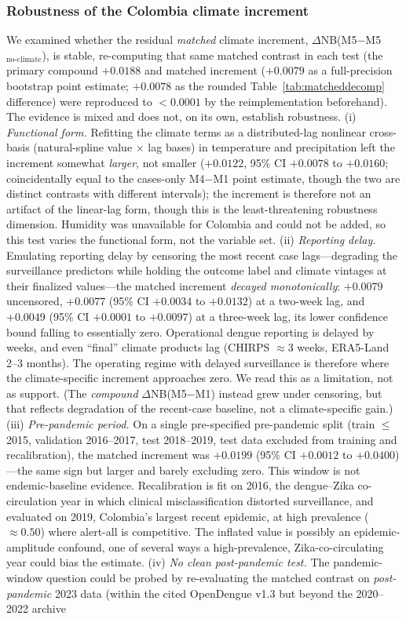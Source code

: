 \documentclass[11pt,a4paper]{article}
\begin{document}
\subsubsection*{Robustness of the Colombia climate increment}
We examined whether the residual \emph{matched} climate increment, $\Delta$NB(M5$-$M5$_{\text{no-climate}}$), is stable, re-computing that same matched contrast in each test (the primary compound $+0.0188$ and matched increment ($+0.0079$ as a full-precision bootstrap point estimate; $+0.0078$ as the rounded Table~\ref{tab:matcheddecomp} difference) were reproduced to $<0.0001$ by the reimplementation beforehand). The evidence is mixed and does not, on its own, establish robustness. (i) \emph{Functional form.} Refitting the climate terms as a distributed-lag nonlinear cross-basis (natural-spline value $\times$ lag bases) in temperature and precipitation left the increment somewhat \emph{larger}, not smaller ($+0.0122$, 95\% CI $+0.0078$ to $+0.0160$; coincidentally equal to the cases-only M4$-$M1 point estimate, though the two are distinct contrasts with different intervals); the increment is therefore not an artifact of the linear-lag form, though this is the least-threatening robustness dimension. Humidity was unavailable for Colombia and could not be added, so this test varies the functional form, not the variable set. (ii) \emph{Reporting delay.} Emulating reporting delay by censoring the most recent case lags---degrading the surveillance predictors while holding the outcome label and climate vintages at their finalized values---the matched increment \emph{decayed monotonically}: $+0.0079$ uncensored, $+0.0077$ (95\% CI $+0.0034$ to $+0.0132$) at a two-week lag, and $+0.0049$ (95\% CI $+0.0001$ to $+0.0097$) at a three-week lag, its lower confidence bound falling to essentially zero. Operational dengue reporting is delayed by weeks, and even ``final'' climate products lag (CHIRPS $\approx$3 weeks, ERA5-Land 2--3 months). The operating regime with delayed surveillance is therefore where the climate-specific increment approaches zero. We read this as a limitation, not as support. (The \emph{compound} $\Delta$NB(M5$-$M1) instead grew under censoring, but that reflects degradation of the recent-case baseline, not a climate-specific gain.) (iii) \emph{Pre-pandemic period.} On a single pre-specified pre-pandemic split (train $\le$2015, validation 2016--2017, test 2018--2019, test data excluded from training and recalibration), the matched increment was $+0.0199$ (95\% CI $+0.0012$ to $+0.0400$)---the same sign but larger and barely excluding zero. This window is not endemic-baseline evidence. Recalibration is fit on 2016, the dengue--Zika co-circulation year in which clinical misclassification distorted surveillance, and evaluated on 2019, Colombia's largest recent epidemic, at high prevalence ($\approx0.50$) where alert-all is competitive. The inflated value is possibly an epidemic-amplitude confound, one of several ways a high-prevalence, Zika-co-circulating year could bias the estimate. (iv) \emph{No clean post-pandemic test.} The pandemic-window question could be probed by re-evaluating the matched contrast on \emph{post-pandemic} 2023 data (within the cited OpenDengue v1.3 but beyond the 2020--2022 archive 
\end{document}
